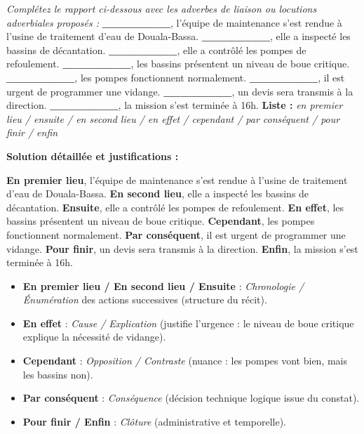 \documentclass[11pt]{article}
\begin{document}
\begin{exoresolu}
\emph{Complétez le rapport ci-dessous avec les adverbes de liaison ou locutions adverbiales proposés :}
\medskip
\og \textbf{\_\_\_\_\_\_\_\_}, l'équipe de maintenance s'est rendue à l'usine de traitement d'eau de Douala-Bassa. \textbf{\_\_\_\_\_\_\_\_}, elle a inspecté les bassins de décantation. \textbf{\_\_\_\_\_\_\_\_}, elle a contrôlé les pompes de refoulement. \textbf{\_\_\_\_\_\_\_\_}, les bassins présentent un niveau de boue critique. \textbf{\_\_\_\_\_\_\_\_}, les pompes fonctionnent normalement. \textbf{\_\_\_\_\_\_\_\_}, il est urgent de programmer une vidange. \textbf{\_\_\_\_\_\_\_\_}, un devis sera transmis à la direction. \textbf{\_\_\_\_\_\_\_\_}, la mission s'est terminée à 16h.\fg
\medskip
\textbf{Liste :} \emph{en premier lieu / ensuite / en second lieu / en effet / cependant / par conséquent / pour finir / enfin}

\tcblower
\textbf{Solution détaillée et justifications :}

\og \textbf{En premier lieu}, l'équipe de maintenance s'est rendue à l'usine de traitement d'eau de Douala-Bassa. \textbf{En second lieu}, elle a inspecté les bassins de décantation. \textbf{Ensuite}, elle a contrôlé les pompes de refoulement. \textbf{En effet}, les bassins présentent un niveau de boue critique. \textbf{Cependant}, les pompes fonctionnent normalement. \textbf{Par conséquent}, il est urgent de programmer une vidange. \textbf{Pour finir}, un devis sera transmis à la direction. \textbf{Enfin}, la mission s'est terminée à 16h.\fg

\begin{itemize}
    \item \textbf{En premier lieu / En second lieu / Ensuite} : \emph{Chronologie / Énumération} des actions successives (structure du récit).
    \item \textbf{En effet} : \emph{Cause / Explication} (justifie l'urgence : le niveau de boue critique explique la nécessité de vidange).
    \item \textbf{Cependant} : \emph{Opposition / Contraste} (nuance : les pompes vont bien, mais les bassins non).
    \item \textbf{Par conséquent} : \emph{Conséquence} (décision technique logique issue du constat).
    \item \textbf{Pour finir / Enfin} : \emph{Clôture} (administrative et temporelle).
\end{itemize}
\end{exoresolu}
\end{document}
